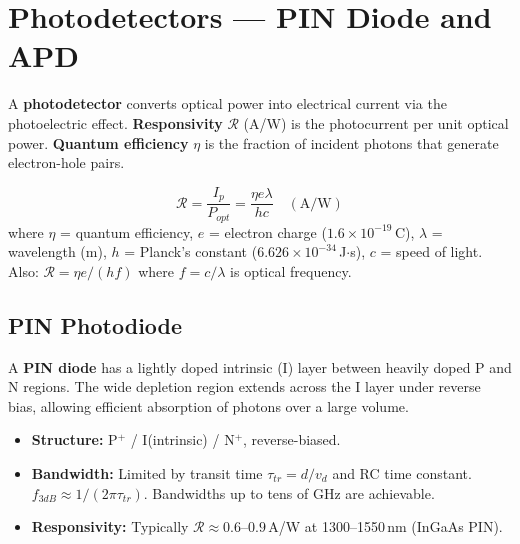 \documentclass[12pt,a4paper]{article}
\begin{document}
\section{Photodetectors --- PIN Diode and APD}

\begin{tcolorbox}[defbox, title={\textbf{Photodetector --- Responsivity and Quantum Efficiency}}]
A \textbf{photodetector} converts optical power into electrical current via the photoelectric effect. \textbf{Responsivity} $\mathcal{R}$ (A/W) is the photocurrent per unit optical power. \textbf{Quantum efficiency} $\eta$ is the fraction of incident photons that generate electron-hole pairs.
\end{tcolorbox}

\begin{tcolorbox}[formulabox, title={\textbf{Responsivity Formula}}]
\[
\mathcal{R} = \frac{I_p}{P_{opt}} = \frac{\eta e \lambda}{hc} \quad (\text{A/W})
\]
where $\eta$ = quantum efficiency, $e$ = electron charge ($1.6\times10^{-19}$\,C), $\lambda$ = wavelength (m), $h$ = Planck's constant ($6.626\times10^{-34}$\,J$\cdot$s), $c$ = speed of light. \\
Also: $\mathcal{R} = \eta e / (hf)$ where $f = c/\lambda$ is optical frequency.
\end{tcolorbox}

\subsection{PIN Photodiode}
A \textbf{PIN diode} has a lightly doped intrinsic (I) layer between heavily doped P and N regions. The wide depletion region extends across the I layer under reverse bias, allowing efficient absorption of photons over a large volume.

\begin{itemize}[leftmargin=*, itemsep=2pt]
  \item \textbf{Structure:} P$^+$ / I(intrinsic) / N$^+$, reverse-biased.
  \item \textbf{Bandwidth:} Limited by transit time $\tau_{tr} = d/v_d$ and RC time constant. $f_{3dB} \approx 1/(2\pi\tau_{tr})$. Bandwidths up to tens of GHz are achievable.
  \item \textbf{Responsivity:} Typically $\mathcal{R} \approx 0.6$--$0.9$\,A/W at 1300--1550\,nm (InGaAs PIN).
\end{itemize}
\end{document}

